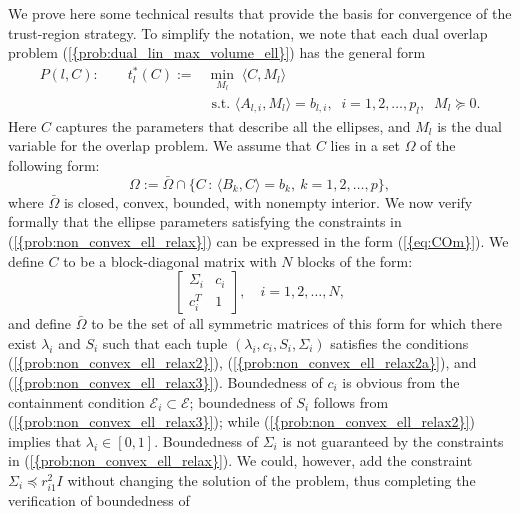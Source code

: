 \documentclass{siamltex}
\begin{document}
We prove here some technical results that provide the basis for
convergence of the trust-region strategy. To simplify the notation, we
note that each dual overlap problem
{(\ref{{prob:dual_lin_max_volume_ell}})} has the general form
\begin{subequations} 
\label{eq:50}
\begin{align}
P(l,C): \qquad
t^*_l(C) := &\min_{M_l}   \;\langle C,M_l \rangle \\
 &\,\,\mbox{s.t.} \,\,\langle A_{l,i},M_l \rangle =b_{l,i}, \;\; i=1,2,\dotsc,p_l, 
\;\; M_l \succeq 0.
\end{align}
\end{subequations}
Here $C$ captures the parameters that describe all the ellipses, and
$M_l$ is the dual variable for the overlap problem. We assume that $C$
lies in a set $\Omega$ of the following form:
\begin{equation} \label{eq:COm}
\Omega := \bar{\Omega} \cap \{ C \, : \, \langle B_k,C \rangle = b_k, \ k=1,2,\dotsc,p \},
\end{equation}
where $\bar{\Omega}$ is closed, convex, bounded, with nonempty
interior. We now verify formally that the ellipse parameters
satisfying the constraints in {(\ref{{prob:non_convex_ell_relax}})} can be
expressed in the form {(\ref{{eq:COm}})}. We define $C$ to be a
block-diagonal matrix with $N$ blocks of the form:
\begin{equation} \label{eq:Cblock}
\left[ \begin{matrix} \Sigma_i & c_i \\ c_i^T & 1 \end{matrix} \right], \quad
i=1,2,\dotsc,N,
\end{equation}
and define $\bar{\Omega}$ to be the set of all symmetric matrices of
this form for which there exist $\lambda_i$ and $S_i$ such that each
tuple $(\lambda_i,c_i,S_i, \Sigma_i)$ satisfies the conditions
{(\ref{{prob:non_convex_ell_relax2}})},
{(\ref{{prob:non_convex_ell_relax2a}})}, and
{(\ref{{prob:non_convex_ell_relax3}})}.  Boundedness of  $c_i$
is obvious from the containment condition $\mathcal{E}_i
\subset \mathcal{E}$; boundedness of $S_i$ follows from
{(\ref{{prob:non_convex_ell_relax3}})}; while
{(\ref{{prob:non_convex_ell_relax2}})} implies that $\lambda_i \in
[0,1]$. Boundedness of $\Sigma_i$ is not guaranteed by the constraints
in {(\ref{{prob:non_convex_ell_relax}})}. We could, however, add the
constraint $\Sigma_i \preceq r_{i1}^2 I$ without changing the solution
of the problem, thus completing the verification of boundedness of
\end{document}
